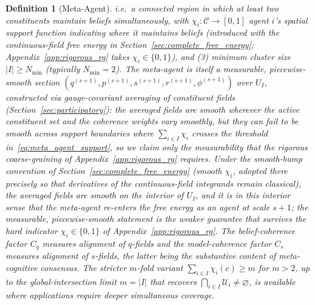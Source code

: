 \documentclass[11pt]{article}
\newtheorem{definition}{Definition}
\begin{document}
\begin{definition}[Meta-Agent]
i.e.\ a connected region in which at least two constituents maintain beliefs simultaneously, with $\chi_i: \mathcal{C} \to [0, 1]$ agent $i$'s spatial support function indicating where it maintains beliefs (introduced with the continuous-field free energy in Section~\ref{sec:complete_free_energy}; Appendix~\ref{app:rigorous_rg} takes $\chi_i \in \{0, 1\}$), and (3) minimum cluster size $|I| \geq N_{\min}$ (typically $N_{\min} = 2$). The meta-agent is itself a measurable, piecewise-smooth section $(q^{(s+1)}, p^{(s+1)}, s^{(s+1)}, r^{(s+1)}, \phi^{(s+1)})$ over $U_I$, constructed via gauge-covariant averaging of constituent fields (Section~\ref{sec:participatory}): the averaged fields are smooth wherever the active constituent set and the coherence weights vary smoothly, but they can fail to be smooth across support boundaries where $\sum_{i \in I}\chi_i$ crosses the threshold in~\eqref{eq:meta_agent_support}, so we claim only the measurability that the rigorous coarse-graining of Appendix~\ref{app:rigorous_rg} requires. Under the smooth-bump convention of Section~\ref{sec:complete_free_energy} (smooth $\chi_i$, adopted there precisely so that derivatives of the continuous-field integrands remain classical), the averaged fields are smooth on the interior of $U_I$, and it is in this interior sense that the meta-agent re-enters the free energy as an agent at scale $s+1$; the measurable, piecewise-smooth statement is the weaker guarantee that survives the hard indicator $\chi_i \in \{0, 1\}$ of Appendix~\ref{app:rigorous_rg}. The belief-coherence factor $C_q$ measures alignment of $q$-fields and the model-coherence factor $C_s$ measures alignment of $s$-fields, the latter being the substantive content of meta-cognitive consensus. The stricter $m$-fold variant $\sum_{i \in I}\chi_i(c) \ge m$ for $m > 2$, up to the global-intersection limit $m = |I|$ that recovers $\bigcap_{i \in I}\mathcal{U}_i \neq \varnothing$, is available where applications require deeper simultaneous coverage.
\end{definition}
\end{document}
